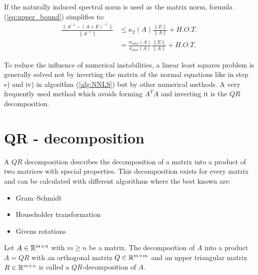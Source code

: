 \begin{remark}
	If the naturally induced spectral norm is used as the matrix norm, formula (\ref{eq:upper_bound}) simplifies to:
	\begin{align*}
		\frac{\lVert A^{-1} - (A + E)^{-1} \rVert}{\lVert A^{-1}\rVert} & \leq \kappa_2(A) \frac{\lVert E \rVert}{\lVert A \rVert} + H.O.T. \\
		& = \frac{\sigma_{max}(A)}{\sigma_{min}(A)} \frac{\lVert E \rVert}{\lVert A \rVert} + H.O.T.
	\end{align*}
\end{remark}


To reduce the influence of numerical instabilities, a linear least squares problem is generally solved not by inverting the matrix of the normal equations like in step e) and iv) in algorithm (\ref{alg:NNLS}) but by other numerical methods. A very frequently used method which avoids forming $A^TA$ and inverting it is the $QR$ decomposition.  

\section{QR - decomposition}

A $QR$ decomposition describes the decomposition of a matrix into a product of two matrices with special properties. This decomposition exists for every matrix and can be calculated with different algorithms where the best known are:

\begin{itemize}
	\item Gram–Schmidt
	\item Householder transformation
	\item Givens rotations
\end{itemize}

\begin{definition}
	Let $A \in \mathbb{R}^{m \times n}$ with $m \geq n$ be a matrix. The decomposition of $A$ into a product $A = QR$ with an orthogonal matrix $Q \in \mathbb{R}^{m \times m}$ and an upper triangular matrix $R \in \mathbb{R}^{m \times n}$ is called a $QR$-decomposition of $A$. 
\end{definition}


